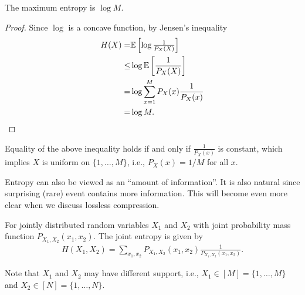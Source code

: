 \documentclass{article}
\begin{document}
\begin{theorem}
    The maximum entropy is $\log M$.
\end{theorem}
\begin{proof}
Since $\log$ is a concave function, by Jensen's inequality
\begin{align}
    H(X) =& \Expec{\log \frac{1}{P_X(X)}}\\
    \leq& \log \Expec{\frac{1}{P_X(X)}}\\
    =& \log \sum_{x=1}^M P_X(x) \frac{1}{P_{X}(x)}\\
    =& \log M.
\end{align}
\end{proof}

Equality of the above inequality holds if and only if $\frac{1}{P_X(x)}$ is constant,
which implies $X$ is uniform on $\{1,\dots,M\}$, i.e., $P_X(x) = 1/M$ for all $x$.

\begin{remark}
    Entropy can also be viewed as an ``amount of information''.
    It is also natural since surprising (rare) event contains more information.
    This will become even more clear when we discuss lossless compression.
\end{remark}
\begin{definition}
    For jointly distributed random variables $X_1$ and $X_2$ with joint probability mass function $P_{X_1, X_2}(x_1, x_2)$.
    The joint entropy is given by
    \begin{align}
        H(X_1, X_2) = \sum_{x_1, x_2} P_{X_1, X_2} (x_1, x_2) \frac{1}{P_{X_1, X_2} (x_1, x_2)}.
    \end{align}
\end{definition}
Note that $X_1$ and $X_2$ may have different support, i.e., $X_1\in[M] = \{1, \dots,M\}$ and $X_2 \in [N] = \{1, \dots, N\}$.
\end{document}
